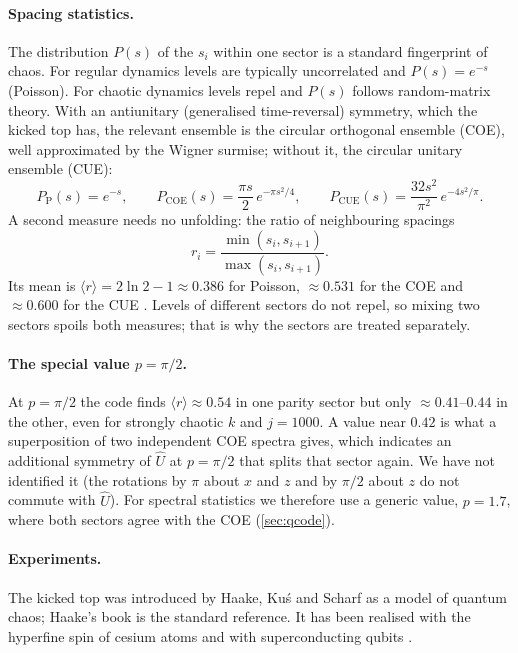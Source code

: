 \documentclass[11pt,a4paper]{article}
\begin{document}
\paragraph{Spacing statistics.} The distribution $P(s)$ of the $s_i$ within one sector is a standard fingerprint of
chaos. For regular dynamics levels are typically uncorrelated and $P(s) = e^{-s}$ (Poisson). For chaotic dynamics
levels repel and $P(s)$ follows random-matrix theory. With an antiunitary (generalised time-reversal) symmetry, which
the kicked top has, the relevant ensemble is the circular orthogonal ensemble (COE), well approximated by the Wigner
surmise; without it, the circular unitary ensemble (CUE):
\begin{equation}\label{eq:wigner}
  P_{\mathrm{P}}(s) = e^{-s}, \qquad P_{\mathrm{COE}}(s) = \frac{\pi s}{2}\,e^{-\pi s^2/4}, \qquad
  P_{\mathrm{CUE}}(s) = \frac{32 s^2}{\pi^2}\,e^{-4s^2/\pi} .
\end{equation}
A second measure needs no unfolding: the ratio of neighbouring spacings
\begin{equation}\label{eq:gap-ratio}
  r_i = \frac{\min(s_i, s_{i+1})}{\max(s_i, s_{i+1})} .
\end{equation}
Its mean is $\langle r\rangle = 2\ln2 - 1 \approx 0.386$ for Poisson, $\approx 0.531$ for the COE and $\approx 0.600$
for the CUE \cite{Atas2013}. Levels of different sectors do not repel, so mixing two sectors spoils both measures;
that is why the sectors are treated separately.

\paragraph{The special value $p = \pi/2$.} At $p = \pi/2$ the code finds $\langle r\rangle \approx 0.54$ in one parity
sector but only $\approx 0.41$--$0.44$ in the other, even for strongly chaotic $k$ and $j = 1000$. A value near
$0.42$ is what a superposition of two independent COE spectra gives, which indicates an additional symmetry of
$\hat U$ at $p = \pi/2$ that splits that sector again. We have not identified it (the rotations by $\pi$ about $x$ and
$z$ and by $\pi/2$ about $z$ do not commute with $\hat U$). For spectral statistics we therefore use a generic value,
$p = 1.7$, where both sectors agree with the COE (\cref{sec:qcode}).

\paragraph{Experiments.} The kicked top was introduced by Haake, Ku\'s and Scharf \cite{HKS1987} as a model of quantum
chaos; Haake's book \cite{Haake} is the standard reference. It has been realised with the hyperfine spin of cesium
atoms \cite{Chaudhury2009} and with superconducting qubits \cite{Neill2016}.
\end{document}

